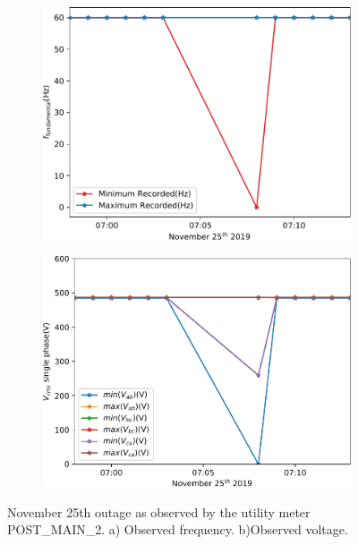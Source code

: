 \begin{figure}[ht!]
    \centering
    \begin{subfigure}{.45\textwidth}
        \centering
        \includegraphics[width=1\linewidth]{img/napali_eval/gt/outage_f.pdf}
        \caption{}
        \label{expdes:fig:gt_outage:f}
    \end{subfigure}\hspace{5mm}
    \begin{subfigure}{.45\textwidth}
        \centering
        \includegraphics[width=1\linewidth]{img/napali_eval/gt/outage_v.pdf}
        \caption{}
        \label{expdes:fig:gt_outage:v}
    \end{subfigure}

    \caption{November 25th outage as observed by the utility meter POST\_MAIN\_2.
    a) Observed frequency.
    b)Observed voltage.}

    \label{expdes:fig:gt_outage}
\end{figure}

